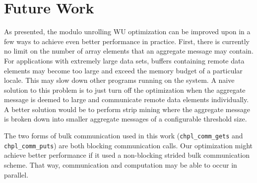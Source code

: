 \section{Future Work}\label{sec:future_work}

As presented, the modulo unrolling WU optimization can be improved upon in a few ways to achieve even better performance in practice. First, there is currently no limit on the number of array elements that an aggregate message may contain. For applications with extremely large data sets, buffers containing remote data elements may become too large and exceed the memory budget of a particular locale. This may slow down other programs running on the system. A naive solution to this problem is to just turn off the optimization when the aggregate message is deemed to large and communicate remote data elements individually. A better solution would be to perform strip mining where the aggregate message is broken down into smaller aggregate messages of a configurable threshold size. 

The two forms of bulk communication used in this work (\texttt{chpl\_comm\_gets} and \texttt{chpl\_comm\_puts}) are both blocking communication calls. Our optimization might achieve better performance if it used a non-blocking strided bulk communication scheme. That way, communication and computation may be able to occur in parallel. 
